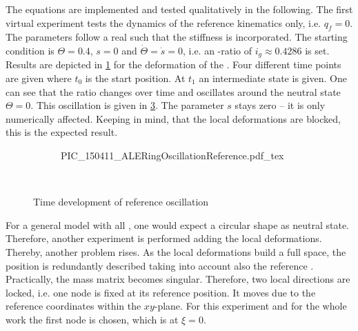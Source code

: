 The equations are implemented and tested qualitatively in the following.
The first virtual experiment tests the dynamics of the reference kinematics only, i.e. $q_f=0$.
The parameters follow a real \ring such that the stiffness is incorporated.
The starting condition is $\Theta=0.4$, $s=0$ and $\dot{\Theta} = \dot{s} = 0$, i.e. an \OD-ratio of $i_g \approx 0.4286$ is set.
Results are depicted in \cref{fig:PIC_150411_ALERingOscillationReference} for the deformation of the \ring.
Four different time points are given where $t_0$ is the start position.
At $t_1$ an intermediate state is given.
One can see that the ratio changes over time and oscillates around the neutral state $\Theta = 0$.
This oscillation is given in \cref{fig:PIC_150411_ALERingOscillationReference_Theta}.
The parameter $s$ stays zero -- it is only numerically affected.
Keeping in mind, that the local deformations are blocked, this is the expected result.\par
%
\begin{figure}
  \begin{center}
    \begin{subfigure}{\textwidth}
      \centering
      {PIC_150411_ALERingOscillationReference.pdf_tex}
      \label{fig:PIC_150411_ALERingOscillationReference}
    \end{subfigure}\\
    \setlength\fheightpgf{3cm}
    \setlength\fwidthpgf{\textwidth}
    \begin{subfigure}{\textwidth}
      \centering
        \label{fig:PIC_150411_ALERingOscillationReference_Theta}
    \end{subfigure}
    \caption{Time development of reference oscillation}
  \end{center}
\end{figure}
%
For a general model with all \DOFs, one would expect a circular shape as neutral state.
Therefore, another experiment is performed adding the local deformations.
Thereby, another problem rises.
As the local deformations build a full space, the position is redundantly described taking into account also the reference \DOFs.
Practically, the mass matrix becomes singular.
Therefore, two local \DOFs directions are locked, i.e. one node is fixed at its reference position.
It moves due to the reference coordinates within the $xy$-plane.
For this experiment and for the whole work the first node is chosen, which is at $\xi=0$.\\
